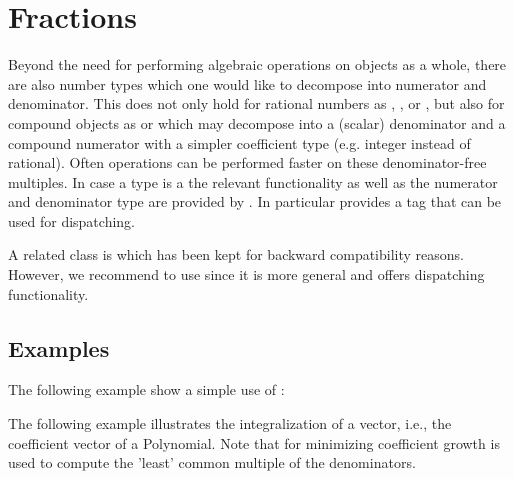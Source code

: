 \section{Fractions}

Beyond the need for performing algebraic operations on objects as a 
whole, there are also number types which one would like to decompose into 
numerator and denominator. This does not only hold for rational numbers 
as , ,  or , but 
also for compound objects as  or  
which may decompose into a (scalar) 
denominator and a compound numerator with a simpler coefficient type 
(e.g. integer instead of rational). Often operations can be performed faster on 
these denominator-free multiples. In case a type is a  
the relevant functionality as well as the numerator and denominator 
type are provided by . In particular  
 provides a tag  that can be
used for dispatching.

A related class is  which has been kept for backward 
compatibility reasons. However, we recommend to use  since
it is more general and offers dispatching functionality. 

\subsection{Examples}

The following example show a simple use of :

The following example illustrates the integralization of a vector, 
i.e., the coefficient vector of a Polynomial. Note that for minimizing 
coefficient growth  is used to 
compute the 'least' common multiple of the denominators.


